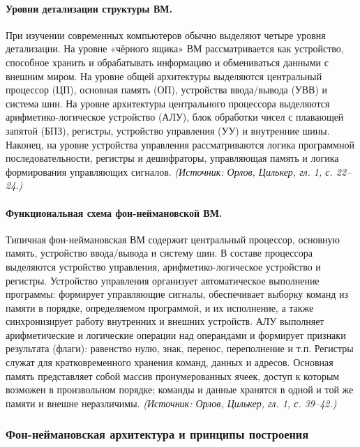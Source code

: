 \documentclass[a4paper,12pt]{article}
\begin{document}
\paragraph{Уровни детализации структуры ВМ.}
При изучении современных компьютеров обычно выделяют четыре уровня детализации. На уровне «чёрного ящика» ВМ рассматривается как устройство, способное хранить и обрабатывать информацию и обмениваться данными с внешним миром. На уровне общей архитектуры выделяются центральный процессор (ЦП), основная память (ОП), устройства ввода/вывода (УВВ) и система шин. На уровне архитектуры центрального процессора выделяются арифметико-логическое устройство (АЛУ), блок обработки чисел с плавающей запятой (БПЗ), регистры, устройство управления (УУ) и внутренние шины. Наконец, на уровне устройства управления рассматриваются логика программной последовательности, регистры и дешифраторы, управляющая память и логика формирования управляющих сигналов.
\textit{(Источник: Орлов, Цилькер, гл. 1, с. 22--24.)}

\paragraph{Функциональная схема фон-неймановской ВМ.}
Типичная фон-неймановская ВМ содержит центральный процессор, основную память, устройство ввода/вывода и систему шин. В составе процессора выделяются устройство управления, арифметико-логическое устройство и регистры. Устройство управления организует автоматическое выполнение программы: формирует управляющие сигналы, обеспечивает выборку команд из памяти в порядке, определяемом программой, и их исполнение, а также синхронизирует работу внутренних и внешних устройств. АЛУ выполняет арифметические и логические операции над операндами и формирует признаки результата (флаги): равенство нулю, знак, перенос, переполнение и т.п. Регистры служат для кратковременного хранения команд, данных и адресов. Основная память представляет собой массив пронумерованных ячеек, доступ к которым возможен в произвольном порядке; команды и данные хранятся в одной и той же памяти и внешне неразличимы.
\textit{(Источник: Орлов, Цилькер, гл. 1, с. 39--42.)}

\subsubsection{Фон-неймановская архитектура и принципы построения}
\end{document}
